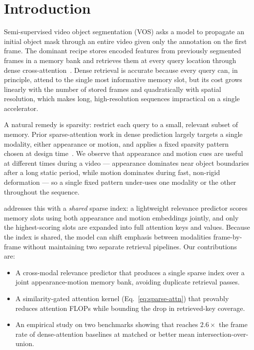 \section{Introduction}
Semi-supervised video object segmentation (VOS) asks a model to propagate an initial object mask through an entire video given only the annotation on the first frame. The dominant recipe stores encoded features from previously segmented frames in a memory bank and retrieves them at every query location through dense cross-attention~\cite{castillo2022stcn,adebayo2024xmem}. Dense retrieval is accurate because every query can, in principle, attend to the single most informative memory slot, but its cost grows linearly with the number of stored frames and quadratically with spatial resolution, which makes long, high-resolution sequences impractical on a single accelerator.

A natural remedy is sparsity: restrict each query to a small, relevant subset of memory. Prior sparse-attention work in dense prediction largely targets a single modality, either appearance or motion, and applies a fixed sparsity pattern chosen at design time~\cite{park2023sparse,osei2021efficient}. We observe that appearance and motion cues are useful at different times during a video --- appearance dominates near object boundaries after a long static period, while motion dominates during fast, non-rigid deformation --- so a single fixed pattern under-uses one modality or the other throughout the sequence.

\methodname{} addresses this with a \emph{shared} sparse index: a lightweight relevance predictor scores memory slots using both appearance and motion embeddings jointly, and only the highest-scoring slots are expanded into full attention keys and values. Because the index is shared, the model can shift emphasis between modalities frame-by-frame without maintaining two separate retrieval pipelines. Our contributions are:

\begin{itemize}
\item A cross-modal relevance predictor that produces a single sparse index over a joint appearance-motion memory bank, avoiding duplicate retrieval passes.
\item A similarity-gated attention kernel (Eq.~\ref{eq:sparse-attn}) that provably reduces attention FLOPs while bounding the drop in retrieved-key coverage.
\item An empirical study on two benchmarks showing that \methodname{} reaches $2.6\times$ the frame rate of dense-attention baselines at matched or better mean intersection-over-union.
\end{itemize}
